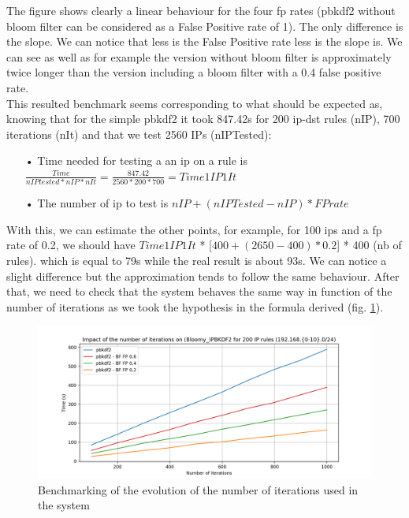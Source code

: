 \documentclass{eplmastersthesis}
\begin{document}
The figure shows clearly a linear behaviour for the four \gls{fp} rates (\gls{pbkdf2} without bloom filter can be considered as a False Positive rate of 1). The only difference is the slope. We can notice that less is the False Positive rate less is the slope is.
We can see as well as for example the version without bloom filter is approximately twice longer than the version including a bloom filter with a 0.4 false positive rate.\\

This resulted benchmark seems corresponding to what should be expected as, knowing that for the simple \gls{pbkdf2} it took 847.42s for 200 ip-dst rules (nIP), 700 iterations (nIt) and that we test 2560 IPs (nIPTested):
\begin{itemize}
\item[•] Time needed for testing a an \gls{ip} on a rule is $\frac{Time}{nIPtested * nIP * nIt}=\frac{847.42}{2560*200*700} = Time1IP1It$
\item[•] The number of \gls{ip} to test is $nIP + (nIPTested - nIP)*FPrate$
\end{itemize}
With this, we can estimate the other points, for example, for 100 \gls{ip}s and a \gls{fp} rate of 0.2, we should have $Time1IP1It$ *  [$400 + (2650 - 400)*0.2$] * 400 (nb of rules). which is equal to 79s while the real result is about 93s. We can notice a slight difference but the approximation tends to follow the same behaviour.
After that, we need to check that the system behaves the same way in function of the number of iterations as we took the hypothesis in the formula derived (fig. \ref{benchmarking:timeiterations}). 

\begin{figure}[h!]
\begin{center}
	\includegraphics[scale=0.6]{res/TimeIterations}
	\caption{Benchmarking of the evolution of the number of iterations used in the system}
	\label{benchmarking:timeiterations}
\end{center}
\end{figure}
\end{document}

